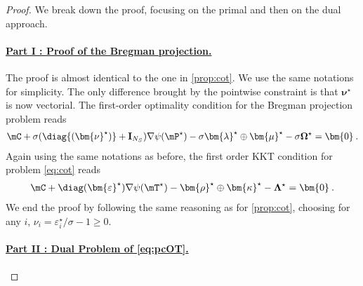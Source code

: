 \begin{proof}
We break down the proof, focusing on the primal and then on the dual approach.

\paragraph{\underline{Part I : Proof of the Bregman projection.}}

The proof is almost identical to the one in \cref{prop:cot}. We use the same notations for simplicity. The only difference brought by the pointwise constraint is that $\bm{\nu}^\star$ is now vectorial. The first-order optimality condition for the Bregman projection problem reads
\begin{align}
    \mC + \sigma (\diag{(\bm{\nu}^\star)} + \mathbf{I}_{N_S}) \nabla \psi(\mP^\star) -  \sigma \bm{\lambda}^\star \oplus \bm{\mu}^\star - \sigma \mathbf{\Omega}^\star= \bm{0} \:.
\end{align}
Again using the same notations as before, the first order KKT condition for problem \eqref{eq:cot} reads
\begin{align}
    \mC + \diag(\bm{\varepsilon}^\star) \nabla \psi(\mT^\star) -  \bm{\rho}^\star \oplus \bm{\kappa}^{\star} - \mathbf{\Lambda}^\star = \bm{0} \:.
\end{align}
We end the proof by following the same reasoning as for \cref{prop:cot}, choosing for any $i$, $\nu_i = \varepsilon_i^\star / \sigma - 1 \geq 0$.

\paragraph{\underline{Part II : Dual Problem of \eqref{eq:pcOT}.}}


\end{proof}
